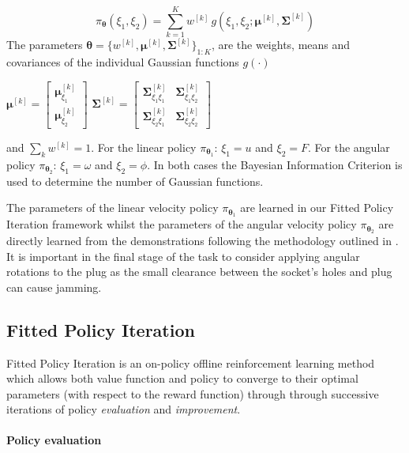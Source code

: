 \documentclass[final,5p,times,twocolumn]{elsarticle}
\newcommand{\SigK}{\boldsymbol{\Sigma}^{[k]}}
\newcommand{\MuK}{\boldsymbol{\mu}^{[k]}}
\newcommand{\piK}{w^{[k]}}
\newcommand{\Param}{\boldsymbol{\theta}}
\begin{document}
\begin{equation}
 \pi_{\Param}(\xi_1,\xi_2) = \sum\limits_{k=1}^{K} \piK \, g(\xi_1,\xi_2;\MuK,\SigK) \label{eq:GMM}
\end{equation}
The parameters $\Param = \{w^{[k]},\MuK,\SigK\}_{1:K}$, are the weights, means and covariances 
of the individual Gaussian functions $g(\cdot)$
\begin{center}
$\MuK =  \begin{bmatrix} \MuK_{\xi_1} \\ \MuK_{\xi_2} \end{bmatrix}$\hspace*{0.5cm}
$\SigK =  \begin{bmatrix} 
	  \SigK_{\xi_1\xi_1} & \SigK_{\xi_1\xi_2} \\
	  \SigK_{\xi_2\xi_1} & \SigK_{\xi_2\xi_2}
	  \end{bmatrix}$
\end{center}
and $\sum_{k} w^{[k]} = 1$. For the linear policy $\pi_{\Param_1}$: ${\xi_1 = u}$ and ${\xi_2 = F}$.
For the angular policy $\pi_{\Param_2}$: ${\xi_1 = \omega}$ and ${\xi_2 = \phi}$. In both cases the Bayesian Information Criterion is used to 
determine the number of Gaussian functions.

The parameters of the linear velocity policy $\pi_{\Param_1}$ are learned in our Fitted Policy Iteration framework
whilst the parameters of the angular velocity policy $\pi_{\Param_2}$ are directly learned from the demonstrations following 
the methodology outlined in \cite[Chap. 5]{Kronander2015}. It is important in the final stage of the task 
to consider applying angular rotations to the plug as the small clearance between the socket's holes and plug 
can cause jamming.

\subsection{Fitted Policy Iteration}\label{sec:FPI}

Fitted Policy Iteration is an on-policy offline reinforcement learning method which 
allows both value function and policy to converge to their optimal parameters (with 
respect to the reward function) through through successive iterations of 
policy \textit{evaluation} and \textit{improvement}.

\paragraph{Policy evaluation}
\end{document}
